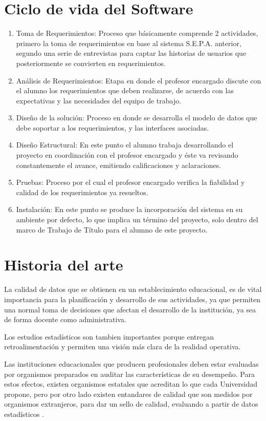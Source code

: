 \documentclass[a4paper,12pt,openany,oneside]{book}
\begin{document}
\section{Ciclo de vida del Software}
\begin{enumerate}
\item Toma de Requerimientos: Proceso que básicamente comprende 2 actividades, primero la toma de requerimientos en base al sistema S.E.P.A. anterior, segundo una serie de entrevistas para captar las historias de usuarios que posteriormente se convierten en requerimientos.
\item Análisis de Requerimientos: Etapa en donde el profesor encargado discute con el alumno los requerimientos que deben realizarse, de acuerdo con las expectativas y las necesidades del equipo de trabajo.
\item Diseño de la solución: Proceso en donde se desarrolla el modelo de datos que debe soportar a los requerimientos, y las interfaces asociadas.
\item Diseño Estructural: En este punto el alumno trabaja desarrollando el proyecto en coordinación con el profesor encargado y éste va revisando constantemente el avance, emitiendo calificaciones y aclaraciones.
\item Pruebas: Proceso por el cual el profesor encargado verifica la fiabilidad y calidad de los requerimientos ya resueltos.
\item Instalación: En este punto se produce la incorporación del sistema en su ambiente por defecto, lo que implica un término del proyecto, solo dentro del marco de Trabajo de Título para el alumno de este proyecto.
\end{enumerate}
\section{Historia del arte}
La calidad de datos que se obtienen en un establecimiento educacional, es de vital importancia para la planificación y desarrollo de sus actividades, ya que permiten una normal toma de decisiones que afectan el desarrollo de la institución, ya sea de forma docente como administrativa. 

Los estudios estadísticos son tambien importantes porque entregan retroalimentación y permiten una visión más clara de la realidad operativa.

Las instituciones educacionales que producen profesionales deben estar evaluadas por organismos preparados en auditar las características de su desempeño. Para estos efectos, existen organismos estatales que acreditan lo que cada Universidad propone, pero por otro lado existen entandares de calidad que son medidos por organismos extranjeros, para dar un sello de calidad, evaluando a partir de datos estadísticos  \cite{data1}.
\end{document}
